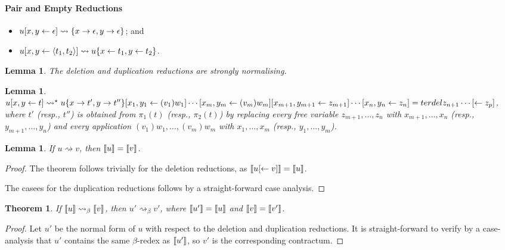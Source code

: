 \documentclass[11pt,a4paper]{article}
\theoremstyle{definition}
\theoremstyle{plain}
\newtheorem{lemma}[definition]{Lemma}
\newtheorem{theorem}[definition]{Theorem}
\theoremstyle{remark}
\begin{document}
\paragraph{Pair and Empty Reductions}

\begin{itemize}
	\item $u{[{x},{y}\leftarrow{\epsilon}]}\rightsquigarrow\{x\rightarrow\epsilon,y\rightarrow\epsilon\}$; and
	\item $u{[{x},{y}\leftarrow{{\langle{t_1},{t_2}\rangle}}]}\rightsquigarrow u\{x\leftarrow t_1,y\leftarrow t_2\}$.
\end{itemize}

\begin{lemma}
	The deletion and duplication reductions are strongly normalising.
\end{lemma}

\begin{lemma}
	$u{[{x},{y}\leftarrow{t}]}\rightsquigarrow^\star u\{x\rightarrow t',y\rightarrow t''\}{[{x_1},{y_1}\leftarrow{(v_1)w_1}]}\cdots{[{x_m},{y_m}\leftarrow{(v_m)w_m}]}{[{x_{m+1}},{y_{m+1}}\leftarrow{z_{m+1}}]}\cdots{[{x_n},{y_n}\leftarrow{z_n}]}=terdel{z_{n+1}}\cdots{[\leftarrow{z_p}]}$,
where $t'$ (resp., $t''$) is obtained from $\pi_1(t)$ (resp., $\pi_2(t)$) by replacing every free variable $z_{m+1},\dots,z_n$ with $x_{m+1},\dots,x_n$ (resp., $y_{m+1},\dots,y_n$) and every application $(v_1)w_1,\dots,(v_m)w_m$ with $x_1,\dots,x_m$ (resp., $y_1,\dots,y_m$).
\end{lemma}

\begin{lemma}
	If $u\rightsquigarrow v$, then ${\llbracket{u}\rrbracket}={\llbracket{v}\rrbracket}$.
\end{lemma}

\begin{proof}
	The theorem follows trivially for the deletion reductions, as ${\llbracket{u{[\leftarrow{v}]}}\rrbracket}={\llbracket{u}\rrbracket}$.

	The casees for the duplication reductions follows by a straight-forward case analysis.
\end{proof}

\begin{theorem}
	If\/ ${\llbracket{u}\rrbracket}\rightsquigarrow_\beta{\llbracket{v}\rrbracket}$, then $u'\rightsquigarrow_\beta v'$, where ${\llbracket{u'}\rrbracket}={\llbracket{u}\rrbracket}$ and ${\llbracket{v}\rrbracket}={\llbracket{v'}\rrbracket}$.
\end{theorem}

\begin{proof}
	Let $u'$ be the normal form of $u$ with respect to the deletion and duplication reductions. It is straight-forward to verify by a case-analysis that $u'$ contains the same $\beta$-redex as ${\llbracket{u'}\rrbracket}$, so $v'$ is the corresponding contractum.
\end{proof}
\end{document}

